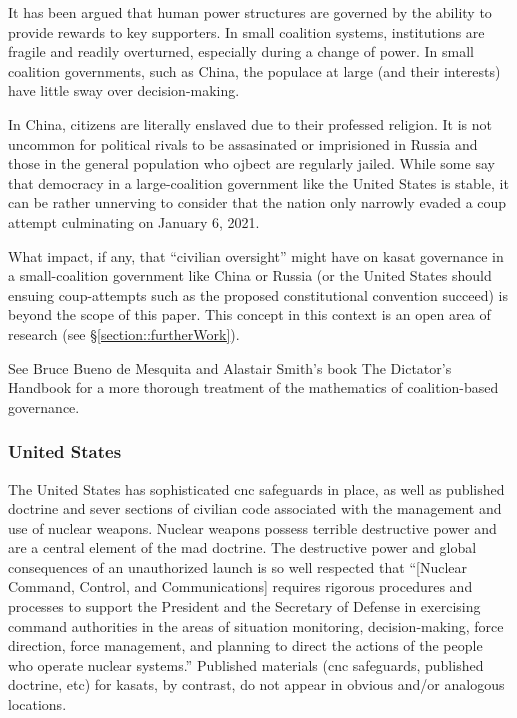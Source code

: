 It has been argued that human power structures are governed by the
ability to provide rewards to key supporters.\cite[ch1]{dictator} In
small coalition systems, institutions are fragile and readily
overturned, especially during a change of power.\cite[ch2]{dictator}
In small coalition governments, such as China, the populace at large
(and their interests) have little sway over
decision-making.\cite[ch1]{dictator}

In China, citizens are literally enslaved due to their professed
religion.\cite{uyghurs} It is not uncommon for political rivals to be
assasinated\cite{polonium} or imprisioned\cite{navalny} in Russia and
those in the general population who ojbect are regularly
jailed.\cite[protestors jailed]{xxx} While some say that democracy in
a large-coalition government like the United States is
stable\cite[chXXX]{dictator}, it can be rather unnerving to consider
that the nation only narrowly evaded a coup attempt culminating on
January 6, 2021.\cite[summary of coup attempt]{xxx}

What impact, if any, that ``civilian oversight'' might have on
\ac{kasat} governance in a small-coalition government like China or
Russia (or the United States should ensuing coup-attempts such as the
proposed constitutional convention succeed) is beyond the scope of
this paper.  This concept in this context is an open area of research
(see \S\ref{section::furtherWork}).

See Bruce Bueno de Mesquita and Alastair Smith's book
\cite{https://www.publicaffairsbooks.com/titles/bruce-bueno-de-mesquita/the-dictators-handbook/9781541701366/}{The
  Dictator's Handbook} for a more thorough treatment of the
mathematics of coalition-based governance.


\subsubsection{United States}

The United States has sophisticated \ac{cnc} safeguards in place, as
well as published doctrine and sever sections of civilian code
associated with the management and use of nuclear weapons.\cite[the
  right joint publication]{xxx} Nuclear weapons possess terrible
destructive power and are a central element of the \acf{mad}
doctrine.\cite[mad overview]{xxx} The destructive power and global
consequences of an unauthorized launch is so well respected that
``[Nuclear Command, Control, and Communications] requires rigorous
procedures and processes to support the President and the Secretary of
Defense in exercising command authorities in the areas of situation
monitoring, decision-making, force direction, force management, and
planning to direct the actions of the people who operate nuclear
systems.''\cite{nuke-matters-handbook} Published materials (\ac{cnc}
safeguards, published doctrine, etc) for \acp{kasat}, by contrast, do
not appear in obvious and/or analogous locations.

